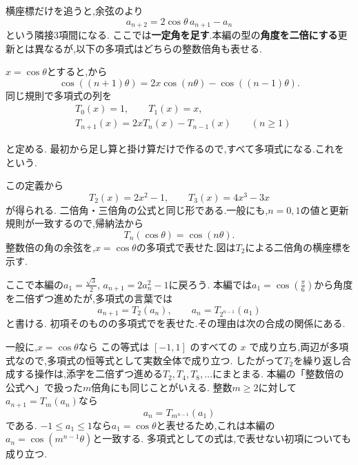 横座標だけを追うと,余弦のより
\[
  a_{n+2}=2\cos\theta\,a_{n+1}-a_n
\]
という隣接3項間になる.
ここでは\textbf{一定角を足す}.本編の型の\textbf{角度を二倍にする}更新とは異なるが,以下の多項式はどちらの整数倍角も表せる.

$x=\cos\theta$とすると,から
\[
  \cos((n+1)\theta)=2x\cos(n\theta)-\cos((n-1)\theta).
\]
同じ規則で多項式の列を
\begin{align*}
  &T_0(x)=1,\qquad T_1(x)=x,\\
  &T_{n+1}(x)=2xT_n(x)-T_{n-1}(x)
  \qquad(n\ge1)
\end{align*}

と定める.
最初から足し算と掛け算だけで作るので,すべて多項式になる.これをという.

この定義から
\[
  T_2(x)=2x^2-1,\qquad
  T_3(x)=4x^3-3x
\]
が得られる.
二倍角・三倍角の公式と同じ形である.一般にも,$n=0,1$の値と更新規則が一致するので,帰納法から
\[
  T_n(\cos\theta)=\cos(n\theta).
\]
整数倍の角の余弦を,$x=\cos\theta$の多項式で表せた.図は$T_2$による二倍角の横座標を示す.
  \BookFigChebyshev

ここで本編の$\displaystyle a_1=\frac{\sqrt3}{2}$, $a_{n+1}=2a_n^2-1$に戻ろう.
本編では$\displaystyle a_1=\cos(\frac{\pi}{6})$から角度を二倍ずつ進めたが,多項式の言葉では
\[
  a_{n+1}=T_2(a_n),\qquad
  a_n=T_{2^{n-1}}(a_1)
\]
と書ける.
初項そのものの多項式でを表せた.その理由は次の合成の関係にある.

一般に,$x=\cos\theta$なら
\BookMathLayout{\[
  T_m(T_k(x))
  =T_m(\cos(k\theta))
  =\cos(mk\theta)
  =T_{mk}(x).
\]}{
\[
\begin{aligned}
T_m(T_k(x))&=T_m(\cos(k\theta))\\
&=\cos(mk\theta)=T_{mk}(x).
\end{aligned}
\]
}
この等式は $[-1,1]$ のすべての $x$ で成り立ち,両辺が多項式なので,多項式の恒等式として実数全体で成り立つ.
したがって$T_2$を繰り返し合成する操作は,添字を二倍ずつ進める$T_2,T_4,T_8,\ldots$にまとまる.
本編の「整数倍の公式へ」で扱った$m$倍角にも同じことがいえる.
整数$m\ge2$に対して$a_{n+1}=T_m(a_n)$なら
\[
  a_n=T_{m^{n-1}}(a_1)
\]
である.
$-1\le a_1\le1$なら$a_1=\cos\theta$と表せるため,これは本編の$a_n=\cos(m^{n-1}\theta)$と一致する.
多項式としての式は,で表せない初項についても成り立つ.

